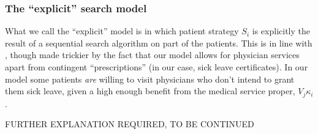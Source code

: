 \documentclass{article}
\begin{document}
\subsubsection{The ``explicit'' search model}

What we call the ``explicit'' model is in which patient strategy $S_i$ is explicitly the result of a sequential search algorithm on part of the patients. This is in line with \cite{schnell2017physician}, though made trickier by the fact that our model allows for physician services apart from contingent ``prescriptions'' (in our case, sick leave certificates). In our model some patients \textit{are} willing to visit physicians who don't intend to grant them sick leave, given a high enough benefit from the medical service proper, $V_j \kappa_i$.

FURTHER EXPLANATION REQUIRED, TO BE CONTINUED
\end{document}
